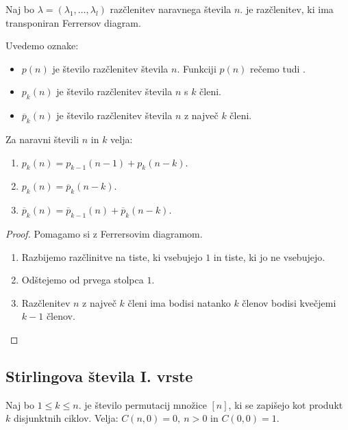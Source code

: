 \begin{definicija}
    Naj bo $\lambda = (\lambda_1, \ldots, \lambda_l)$ razčlenitev naravnega števila $n$.  je razčlenitev, ki ima transponiran Ferrersov diagram.
\end{definicija}

Uvedemo oznake:
\begin{itemize}
    \item $p(n)$ je število razčlenitev števila $n$. Funkciji $p(n)$ rečemo tudi .
    \item $p_k(n)$ je število razčlenitev števila $n$ s $k$ členi.
    \item $\overline{p}_k(n)$ je število razčlenitev števila $n$ z največ $k$ členi.
\end{itemize}

\begin{trditev}
    Za naravni števili $n$ in $k$ velja:
    \begin{enumerate}
        \item $p_k(n) = p_{k-1}(n-1) + p_k(n-k)$.
        \item $p_k(n) = \overline{p}_k(n-k)$.
        \item $\overline{p}_k(n) = \overline{p}_{k-1}(n) + \overline{p}_k(n-k)$.
    \end{enumerate}
\end{trditev}

\begin{proof}
    Pomagamo si z Ferrersovim diagramom.
    \begin{enumerate}
        \item Razbijemo razčlinitve na tiste, ki vsebujejo $1$ in tiste, ki jo ne vsebujejo.
        \item Odštejemo od prvega stolpca $1$.
        \item Razčlenitev $n$ z največ $k$ členi ima bodisi natanko $k$ členov bodisi kvečjemi $k-1$ členov. \qedhere
    \end{enumerate}
\end{proof}

\subsection{Stirlingova števila I. vrste}
\begin{definicija}
    Naj bo $1 \leq k \leq n$.  je število permutacij množice $[n]$, ki se zapišejo kot produkt $k$ disjunktnih ciklov.
    Velja: $C(n, 0) = 0, \ n > 0$ in $C(0,0) = 1$.
\end{definicija}

